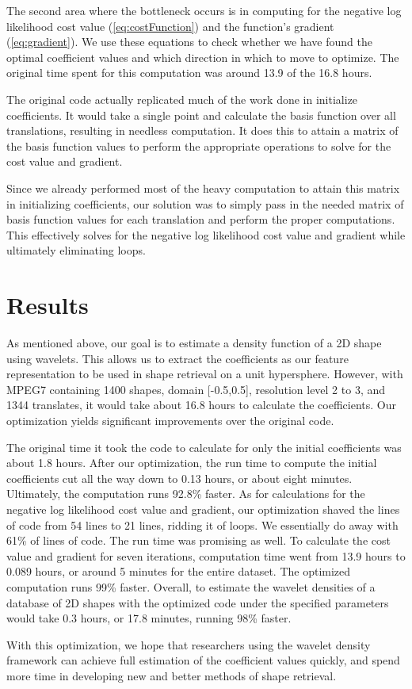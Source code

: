 \documentclass[../tech_report_1.tex]{subfiles}
\begin{document}
The second area where the bottleneck occurs is in computing for the
negative log likelihood cost value (\ref{eq:costFunction}) and the
function's gradient (\ref{eq:gradient}). We use these equations to
check whether we have found the  optimal coefficient values and
which direction in which to move to optimize. The original time spent for this
computation was around 13.9 of the 16.8 hours. 

The original code actually replicated much of the work done in initialize coefficients. It would take a single point and calculate the basis
function over all translations, resulting in needless computation.
It does this to attain a matrix of the basis function values to perform
the appropriate operations to solve for the cost value and gradient. 

Since we already performed most of the heavy computation to attain
this matrix in initializing coefficients, our solution was to simply
pass in the needed matrix of basis function values for each translation
and perform the proper computations. This effectively solves for the
negative log likelihood cost value and gradient while ultimately eliminating
loops. 

\section{Results}

As mentioned above, our goal is to estimate a density function of
a 2D shape using wavelets. This allows us to extract the coefficients
as our feature representation to be used in shape retrieval on a unit
hypersphere. However, with MPEG7 containing 1400 shapes, domain {[}-0.5,0.5{]},
resolution level 2 to 3, and 1344 translates, it would take about 16.8
hours to calculate the coefficients. Our optimization yields significant improvements over the original code.

The original time it took the code to calculate for only the initial
coefficients was about 1.8 hours. After our optimization, the run
time to compute the initial coefficients cut all the way down to 0.13
hours, or about eight minutes. Ultimately, the computation runs 92.8\%
faster. As for calculations for the negative log likelihood cost value
and gradient, our optimization shaved the lines of code from 54 lines
to 21 lines, ridding it of loops. We essentially do away with 61\%
of lines of code. The run time was promising as well. To calculate
the cost value and gradient for seven iterations, computation time
went from 13.9 hours to 0.089 hours, or around 5 minutes for the entire
dataset. The optimized computation runs 99\% faster. Overall, to estimate
the wavelet densities of a database of 2D shapes with the optimized
code under the specified parameters would take 0.3 hours, or 17.8
minutes, running 98\% faster.

With this optimization, we hope that researchers using the wavelet density framework can achieve full estimation of the coefficient values quickly, and spend more
time in developing new and better methods of shape retrieval.
\end{document}
